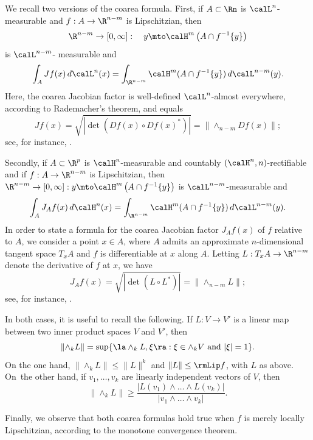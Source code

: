 \begin{Empty}
\label{coarea}
We recall two versions of the coarea formula.
First, if $A \subset \Rn$ is $\calL^n$-measurable and $f: A \to \R^{n-m}$ is Lipschitzian, then
\[
\R^{n-m} \to [0,\infty]:\quad y \mto \calH^m \left(A \cap f^{-1}\{y\} \right)
\]
is $\calL^{n-m}$- measurable and
\begin{equation*}
\int_A Jf(x) \,d\calL^n(x) = \int_{\R^{n-m}} \calH^m(A \cap f^{-1}\{y \}) \,d\calL^{n-m}(y).
\end{equation*}
Here, the coarea Jacobian factor is well-defined $\calL^n$-almost everywhere, according to Rademacher's theorem, and equals
\begin{equation*}
Jf(x) = \sqrt{ \left| \det \left(Df(x) \circ Df(x)^*\right)\right|} =\| {\wedge}_{n-m} Df(x)\| ;
\end{equation*}
see, for instance, \cite[Chap.\,3, \S 4]{EVANS.GARIEPY}.
\par
Secondly, if $A \subset \R^p$ is $\calH^n$-measurable and countably $(\calH^n,n)$-rectifiable and if $f: A \to \R^{n-m}$ is Lipschitzian, then $\R^{n-m} \to [0,\infty]: y \mto \calH^m \left(A \cap f^{-1}\{y\} \right)$ is $\calL^{n-m}$-measurable and
\begin{equation*}
\int_A J_Af(x) \,d\calH^n(x) = \int_{\R^{n-m}} \calH^m(A \cap f^{-1}\{y \}) \,d\calL^{n-m}(y).
\end{equation*}
In order to state a formula for the coarea Jacobian factor $J_Af(x)$ of $f$ relative to $A$, we consider a point $x \in A$, where $A$ admits an approximate $n$-dimensional tangent space $T_xA$ and $f$ is differentiable at $x$ along $A$.
Letting $L: T_x A \to \R^{n-m}$ denote the derivative of $f$ at $x$, we have
\begin{equation*}
J_Af(x) = \sqrt{ \left| \det \left(L \circ L^*\right)\right|} =\|{\wedge}_{n-m} L\| ;
\end{equation*}
see, for instance, \cite[3.2.22]{GMT}.
\par
In both cases, it is useful to recall the following.
If $L: V \to V'$ is a linear map between two inner product spaces $V$ and $V'$, then
\begin{equation}
\label{eq.11}
\|{\wedge}_k L \| = \sup\{ \la \wedge_k L, \xi \ra: \xi \in \wedge_k V \text{ and } |\xi| = 1\}.
\end{equation}
On the one hand, $\|{\wedge}_k L\| \leq \|L\|^k$ \cite[1.7.6]{GMT} and $\|L\| \leq \rmLip f$, with $L$ as above.
On~the other hand, if $v_1,\ldots,v_k$ are linearly independent vectors of $V$, then
\begin{equation}
\label{eq.12}
\|{\wedge}_k L \| \geq \frac{|L(v_1)\wedge \ldots \wedge L(v_k)|}{|v_1 \wedge \ldots \wedge v_k|}.
\end{equation}
\par
Finally, we observe that both coarea formulas hold true when $f$ is merely locally Lipschitzian, according to the monotone convergence theorem.
\end{Empty}

